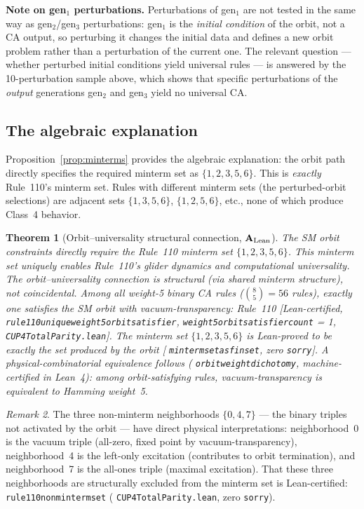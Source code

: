 \documentclass[11pt]{article}
\newtheorem{theorem}{Theorem}[section]
\theoremstyle{remark}
\newtheorem{remark}[theorem]{Remark}
\newcommand{\lean}[1]{%
  \penalty-100
  \begingroup\def\_{\textunderscore\allowbreak}\texttt{#1}\endgroup}
\newcommand{\CatAL}{\ensuremath{\textbf{A}_{\rm Lean}}}
\begin{document}
\textbf{Note on gen$_1$ perturbations.}
Perturbations of gen$_1$ are not tested in the same way as gen$_2$/gen$_3$ perturbations:
gen$_1$ is the \emph{initial condition} of the orbit, not a CA output, so perturbing it
changes the initial data and defines a new orbit problem rather than a perturbation of the
current one. The relevant question --- whether perturbed initial conditions yield universal
rules --- is answered by the 10-perturbation sample above, which shows that specific
perturbations of the \emph{output} generations gen$_2$ and gen$_3$ yield no universal CA.

\subsection{The algebraic explanation}

Proposition~\ref{prop:minterms} provides the algebraic explanation:
the orbit path directly specifies the required minterm set as $\{1,2,3,5,6\}$.
This is \emph{exactly} Rule~110's minterm set. Rules with different minterm sets
(the perturbed-orbit selections) are adjacent sets $\{1,3,5,6\}$, $\{1,2,5,6\}$, etc.,
none of which produce Class~4 behavior.

\begin{theorem}[Orbit--universality structural connection, $\CatAL$]
\label{thm:orbit_universality}
The SM orbit constraints directly require the Rule~110 minterm set $\{1,2,3,5,6\}$.
This minterm set uniquely enables Rule~110's glider dynamics and computational universality.
The orbit--universality connection is structural (via shared minterm structure), not
coincidental.
Among all weight-5 binary CA rules ($\binom{8}{5} = 56$ rules), exactly one satisfies
the SM orbit with vacuum-transparency: Rule~110 [Lean-certified, \lean{rule110\_unique\_weight5\_orbit\_satisfier},
\lean{weight5\_orbit\_satisfier\_count} = 1, \lean{CUP4TotalParity.lean}].
The minterm set $\{1,2,3,5,6\}$ is Lean-proved to be exactly the set produced by the orbit
[\lean{minterm\_set\_as\_finset}, zero \texttt{sorry}].
A physical-combinatorial equivalence follows (\lean{orbit\_weight\_dichotomy}, machine-certified in Lean~4):
among orbit-satisfying rules, vacuum-transparency is equivalent to Hamming weight~5.
\end{theorem}

\begin{remark}
The three non-minterm neighborhoods $\{0,4,7\}$ — the binary triples not activated by the orbit —
have direct physical interpretations: neighborhood~0 is the vacuum triple (all-zero,
fixed point by vacuum-transparency), neighborhood~4 is the left-only excitation (contributes
to orbit termination), and neighborhood~7 is the all-ones triple (maximal excitation).
That these three neighborhoods are structurally excluded from the minterm set
is Lean-certified: \lean{rule110\_non\_minterm\_set} (\lean{CUP4TotalParity.lean}, zero \texttt{sorry}).
\end{remark}
\end{document}
